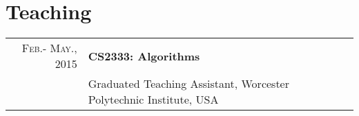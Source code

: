 \documentclass[a4paper,10pt]{article} %
\begin{document}
    \iffalse
    \section{Work-in-Progress}
    \begin{enumerate}[label=(P\arabic*)., resume]
    
        {\item \label{aod}
         Mingrui Wei, \textbf{{Xinyue Liu}}, Xiangnan Kong, Elke A. Rundensteiner.
         ``Active Outlier Detection''. %
         }
    
        {\item \label{csg}
         \textbf{{Xinyue Liu}}, Xiangnan Kong, Lei Liu, Kuorong Chiang.
         ``Context-Sensitive Sequence GAN''. %
         }
    
        {\item 
         \label{ctom}
         Jianjun Luo, \textbf{{Xinyue Liu}}, Xiangnan Kong.
         ``Continuous Opinion Maximization''.
         }
    
        {\item 
         \label{pn}
         Yao Zhang, \textbf{{Xinyue Liu}}, Yun Xiong, Xiangnan Kong, Yangyong Zhu.
          ``Pointer Network for Opinion Maximization''.
         }
    \end{enumerate}
    \fi
    
    
    
    \section{Teaching}
    \begin{tabular}{rl}	
    \textsc{Feb.- May., 2015} & \textbf{CS2333: Algorithms}  \\
    & Graduated Teaching Assistant, Worcester Polytechnic Institute, USA\\
    \end{tabular}
    
\end{document}
